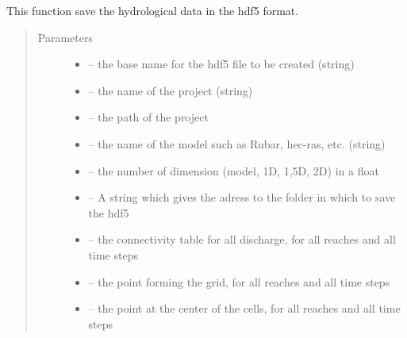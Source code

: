 \documentclass[letterpaper,10pt,english]{sphinxmanual}
\begin{document}
\begin{fulllineitems}
\label{\detokenize{index:src.load_hdf5.save_hdf5}}
This function save the hydrological data in the hdf5 format.
\begin{quote}\begin{description}
\item[{Parameters}] \leavevmode\begin{itemize}
\item {} 
 -- the base name for the hdf5 file to be created (string)

\item {} 
 -- the name of the project (string)

\item {} 
 -- the path of the project

\item {} 
 -- the name of the model such as Rubar, hec-ras, etc. (string)

\item {} 
 -- the number of dimension (model, 1D, 1,5D, 2D) in a float

\item {} 
 -- A string which gives the adress to the folder in which to save the hdf5

\item {} 
 -- the connectivity table for all discharge, for all reaches and all time steps

\item {} 
 -- the point forming the grid, for all reaches and all time steps

\item {} 
 -- the point at the center of the cells, for all reaches and all time steps


\end{itemize}
\end{description}
\end{quote}
\end{fulllineitems}
\end{document}
